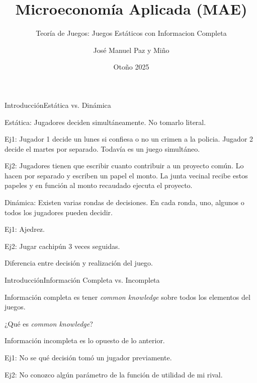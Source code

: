 \documentclass[notes, 11pt]{beamer} %
\newenvironment{wideitemize}{\itemize\addtolength{\itemsep}{10pt}}{\enditemize}
\begin{document}
\title{Microeconom\'ia Aplicada (MAE)}   
\subtitle{Teor\'ia de Juegos: Juegos Est\'aticos con Informacion Completa}   
\author[Paz y Mino ]{Jos\'e Manuel Paz y Mi\~no}
\date{Oto\~no 2025} 

\frame{\titlepage} 

\begin{frame}{Introducci\'on}{Est\'atica vs. Din\'amica}
	\begin{wideitemize}
		\item<1-> Est\'atica: Jugadores deciden simult\'aneamente. No tomarlo literal. 
		\begin{wideitemize}
			\item<2->[--] Ej1: Jugador 1 decide un lunes si confiesa o no un crimen a la policia. Jugador 2 decide el martes por separado. Todav\'ia es un juego simult\'aneo.
			\item<3->[--] Ej2: Jugadores tienen que escribir cuanto contribuir a un proyecto com\'un. Lo hacen por separado y escriben un papel el monto. La junta vecinal recibe estos papeles y en funci\'on al monto recaudado ejecuta el proyecto.
		\end{wideitemize}

		\item<4-> Din\'amica: Existen varias rondas de decisiones. En cada ronda, uno, algunos o todos los jugadores pueden decidir.
		\begin{wideitemize}
			\item<5->[--] Ej1: Ajedrez.
			\item<6->[--] Ej2: Jugar cachip\'un 3 veces seguidas.
		\end{wideitemize}

		\item<7-> Diferencia entre decisi\'on y realizaci\'on del juego.

	\end{wideitemize}
\end{frame}

\begin{frame}{Introducci\'on}{Informaci\'on Completa vs. Incompleta}
	\begin{wideitemize}
		\item<1-> Informaci\'on completa es tener \textit{common knowledge} sobre todos los elementos del juegos.
		\begin{wideitemize}
			\item<2->[--] ¿Qu\'e es \textit{common knowledge}? 
		\end{wideitemize}

		\item<3-> Informaci\'on incompleta es lo opuesto de lo anterior.
		\begin{wideitemize}
			\item<4->[--] Ej1: No se qu\'e decisi\'on tom\'o un jugador previamente.
			\item<5->[--] Ej2: No conozco alg\'un par\'ametro de la funci\'on de utilidad de mi rival.
		\end{wideitemize}
	\end{wideitemize}
\end{frame}
\end{document}
